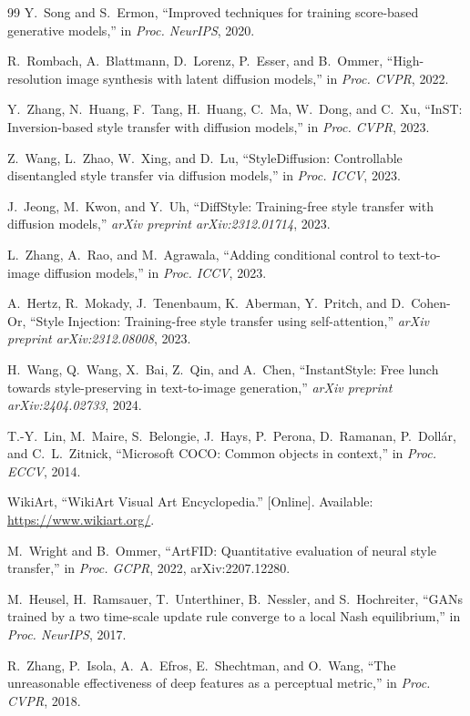 \documentclass[10pt,twocolumn]{article}
\begin{document}
\begin{thebibliography}{99}
 Y.~Song and S.~Ermon, ``Improved techniques for training score-based generative models,'' in \emph{Proc. NeurIPS}, 2020.

 R.~Rombach, A.~Blattmann, D.~Lorenz, P.~Esser, and B.~Ommer, ``High-resolution image synthesis with latent diffusion models,'' in \emph{Proc. CVPR}, 2022.

 Y.~Zhang, N.~Huang, F.~Tang, H.~Huang, C.~Ma, W.~Dong, and C.~Xu, ``InST: Inversion-based style transfer with diffusion models,'' in \emph{Proc. CVPR}, 2023.

 Z.~Wang, L.~Zhao, W.~Xing, and D.~Lu, ``StyleDiffusion: Controllable disentangled style transfer via diffusion models,'' in \emph{Proc. ICCV}, 2023.

 J.~Jeong, M.~Kwon, and Y.~Uh, ``DiffStyle: Training-free style transfer with diffusion models,'' \emph{arXiv preprint arXiv:2312.01714}, 2023.

 L.~Zhang, A.~Rao, and M.~Agrawala, ``Adding conditional control to text-to-image diffusion models,'' in \emph{Proc. ICCV}, 2023.

 A.~Hertz, R.~Mokady, J.~Tenenbaum, K.~Aberman, Y.~Pritch, and D.~Cohen-Or, ``Style Injection: Training-free style transfer using self-attention,'' \emph{arXiv preprint arXiv:2312.08008}, 2023.

 H.~Wang, Q.~Wang, X.~Bai, Z.~Qin, and A.~Chen, ``InstantStyle: Free lunch towards style-preserving in text-to-image generation,'' \emph{arXiv preprint arXiv:2404.02733}, 2024.

 T.-Y.~Lin, M.~Maire, S.~Belongie, J.~Hays, P.~Perona, D.~Ramanan, P.~Doll\'{a}r, and C.~L.~Zitnick, ``Microsoft COCO: Common objects in context,'' in \emph{Proc. ECCV}, 2014.

 WikiArt, ``WikiArt Visual Art Encyclopedia.'' [Online]. Available: \url{https://www.wikiart.org/}.

 M.~Wright and B.~Ommer, ``ArtFID: Quantitative evaluation of neural style transfer,'' in \emph{Proc. GCPR}, 2022, arXiv:2207.12280.

 M.~Heusel, H.~Ramsauer, T.~Unterthiner, B.~Nessler, and S.~Hochreiter, ``GANs trained by a two time-scale update rule converge to a local Nash equilibrium,'' in \emph{Proc. NeurIPS}, 2017.

 R.~Zhang, P.~Isola, A.~A.~Efros, E.~Shechtman, and O.~Wang, ``The unreasonable effectiveness of deep features as a perceptual metric,'' in \emph{Proc. CVPR}, 2018.


\end{thebibliography}
\end{document}
